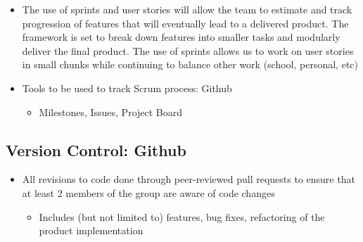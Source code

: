 \documentclass[12pt, titlepage]{article}
\begin{document}
\begin{itemize}
\begin{itemize}
\begin{itemize}
\begin{itemize}
            \end{itemize}
        \end{itemize}
    \end{itemize}
    \item The use of sprints and user stories will allow the team to estimate and track progression of features that will eventually lead to a delivered product. The framework is set to break down features into smaller tasks and modularly deliver the final product. The use of sprints allows us to work on user stories in small chunks while continuing to balance other work (school, personal, etc)
    \item Tools to be used to track Scrum process: Github
    \begin{itemize}
        \item Milestones, Issues, Project Board
    \end{itemize}
\end{itemize}


\subsection{Version Control: Github}
\begin{itemize}
    \item All revisions to code done through peer-reviewed pull requests to ensure that at least 2 members of the group are aware of code changes
    \begin{itemize}
        \item Includes (but not limited to) features, bug fixes, refactoring of the product implementation
    \end{itemize}
\end{itemize}
\end{document}
